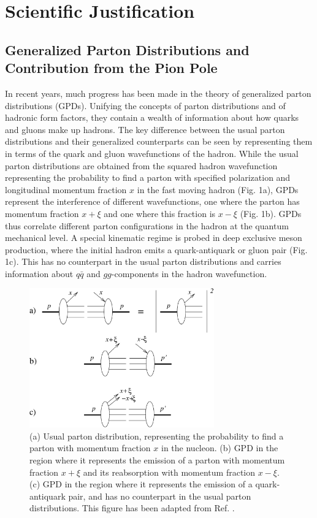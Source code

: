 \section{Scientific Justification}

\subsection{Generalized Parton Distributions and Contribution from the Pion
  Pole}

In recent years, much progress has been made in the theory of generalized
parton distributions (GPDs).  Unifying the concepts of parton distributions and
of hadronic form factors, they contain a wealth of information about how quarks
and gluons make up hadrons. The key difference between the usual parton
distributions and their generalized counterparts can be seen by representing
them in terms of the quark and gluon wavefunctions of the hadron.  While the
usual parton distributions are obtained from the squared hadron wavefunction
representing the probability to find a parton with specified polarization and
longitudinal momentum fraction $x$ in the fast moving hadron (Fig. 1a), GPDs
represent the interference of different wavefunctions, one where the parton has
momentum fraction $x+\xi$ and one where this fraction is $x-\xi$ (Fig. 1b).
GPDs thus correlate different parton configurations in the hadron at the
quantum mechanical level.  A special kinematic regime is probed in deep
exclusive meson production, where the initial hadron emits a quark-antiquark or
gluon pair (Fig. 1c).  This has no counterpart in the usual parton
distributions and carries information about $q\bar{q}$ and $gg$-components in
the hadron wavefunction.

\begin{figure}[hbtp!]
\begin{center}
\includegraphics[height=6cm]{./figures/pdist_gpd_comparo.pdf}
\end{center}
\caption{\label{fig:pdis_gpd_comparo}
\footnotesize{
(a) Usual parton distribution, representing the probability to find a parton
with momentum fraction $x$ in the nucleon.
(b) GPD in the region where it represents the emission of a parton with
momentum fraction $x+\xi$ and its reabsorption with momentum fraction $x-\xi$.
(c) GPD in the region where it represents the emission of a quark-antiquark
pair, and has no counterpart in the usual parton distributions.
This figure has been adapted from Ref. \cite{Di00}.}
}
\end{figure}

